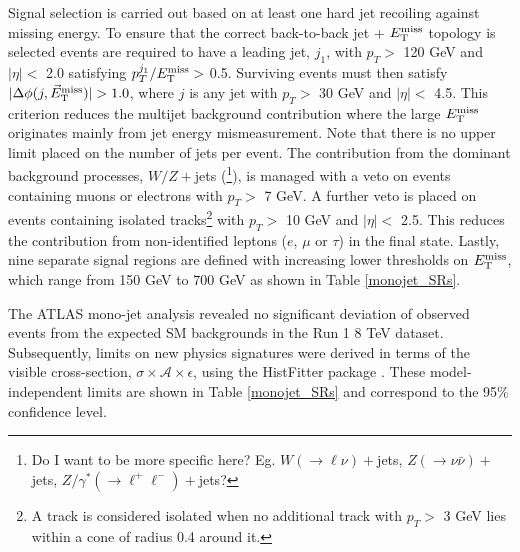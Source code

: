 Signal selection is carried out based on at least one hard jet recoiling against missing energy. To ensure that the correct back-to-back jet + $E_{\mathrm{T}}^{\mathrm{miss}}$ topology is selected events are required to have a leading jet, $j_{1}$, with $p_{T} >$ 120 GeV and $|\eta| <$ 2.0 satisfying $p_{T}^{j_{1}}/E_{\mathrm{T}}^{\mathrm{miss}} >$ 0.5. Surviving events must then satisfy $|\Delta\phi(j,\metvec)|>1.0$, where $j$ is any jet with $p_{T} >$ 30 GeV and $|\eta| <$ 4.5. This criterion reduces the multijet background contribution where the large $E_{\mathrm{T}}^{\mathrm{miss}}$ originates mainly from jet energy mismeasurement. Note that there is no upper limit placed on the number of jets per event. The contribution from the dominant background processes, $W/Z+$jets (\footnote{Do I want to be more specific here? Eg. $W (\rightarrow \ell \nu)+$jets, $Z(\rightarrow \nu\bar{\nu})+$jets, $Z/\gamma^{*}(\rightarrow \ell^{+}\ell^{-})+$jets?}), is managed with a veto on events containing muons or electrons with $p_{T}>$ 7 GeV. A further veto is placed on events containing isolated tracks\footnote{A track is considered isolated when no additional track with $p_{T} >$ 3 GeV lies within a cone of radius 0.4 around it.} with $p_{T}>$ 10 GeV and $|\eta| <$ 2.5. This reduces the contribution from non-identified leptons ($e$, $\mu$ or $\tau$) in the final state. Lastly, nine separate signal regions are defined with increasing lower thresholds on $E_{\mathrm{T}}^{\mathrm{miss}}$, which range from 150 GeV to 700 GeV as shown in Table \ref{monojet_SRs}.

The ATLAS mono-jet analysis revealed no significant deviation of observed events from the expected SM backgrounds in the Run 1 8 TeV dataset. Subsequently, limits on new physics signatures were derived in terms of the visible cross-section, $\sigma\times\mathcal{A}\times\epsilon$, using the HistFitter package \cite{}. These model-independent limits are shown in Table \ref{monojet_SRs} and correspond to the 95\% confidence level.

